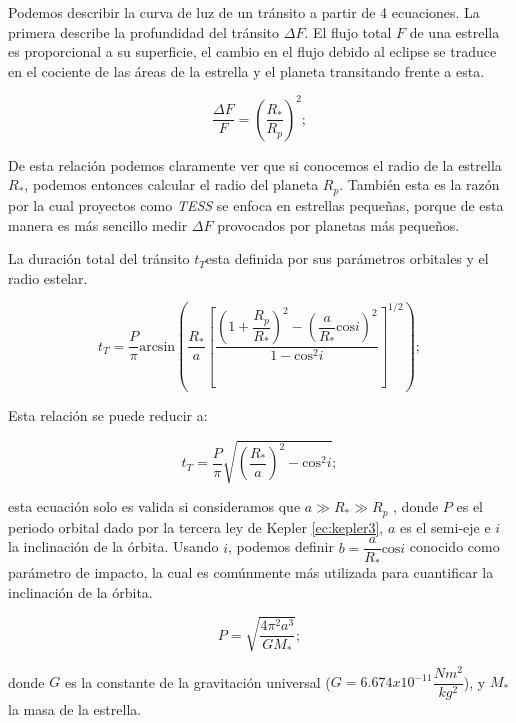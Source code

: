 Podemos describir la curva de luz de un tránsito a partir de 4 ecuaciones. La primera describe la profundidad del tránsito $\Delta F$. El flujo total $F$ de una estrella es proporcional a su superficie, el cambio en el flujo debido al eclipse se traduce en el cociente de las áreas de la estrella y el planeta transitando frente a esta.

\begin{equation}
  \displaystyle \dfrac{\Delta F}{F}=\left(\dfrac{R_*}{R_p} \right)^{2} ;
\end{equation}

De esta relación podemos claramente ver que si conocemos el radio de la estrella $R_{*}$, podemos entonces calcular el radio del planeta $R_{p}$. También esta es la razón por la cual proyectos como \textit{TESS} se enfoca en estrellas pequeñas, porque de esta manera es más sencillo medir $\Delta F$ provocados por planetas más pequeños.

La duración total del tránsito $t_{T}$esta definida por sus parámetros orbitales y el radio estelar.

\begin{equation}
\label{ec:tiempoTransito}
\displaystyle t_{T}=\dfrac{P}{\pi} \mbox{arcsin} \left(\dfrac{R_{*}}{a}\left[ \dfrac{\left( 1+\dfrac{R_{p}}{R_{*}}\right)^{2}-\left( \dfrac{a}{R_{*}} \mbox{cos} i\right)^{2}}{1-\mbox{cos}^{2}i} \right]^{1/2}  \right); 
\end{equation}

Esta relación se puede reducir a:

\begin{equation}
\label{ec:tiempoTransitoReduc}
\displaystyle t_{T}=\dfrac{P}{\pi}\sqrt{\left(\dfrac{R_{*}}{a} \right)^{2}- \mbox{cos}^{2}i};
\end{equation}

esta ecuación solo es valida si consideramos que $a\gg R_{*}\gg R_{p}$ \cite{winn2010transits}, donde $P$ es el periodo orbital dado por la tercera ley de Kepler \ref{ec:kepler3}, $a$ es el semi-eje e $i$ la inclinación de la órbita. Usando $i$, podemos definir $b=\dfrac{a}{R_{*}}\mbox{cos}i$ conocido como parámetro de impacto, la cual es comúnmente más utilizada para cuantificar la inclinación de la órbita. 

\begin{equation}
\label{ec:kepler3}
\displaystyle P=\sqrt{\dfrac{4\pi^{2}a^{3}}{GM_{*}}};
\end{equation} 

donde $G$ es la constante de la gravitación universal ($G=6.674x10^{-11}\dfrac{Nm^{2}}{kg^{2}}$), y $M_{*}$ la masa de la estrella.

